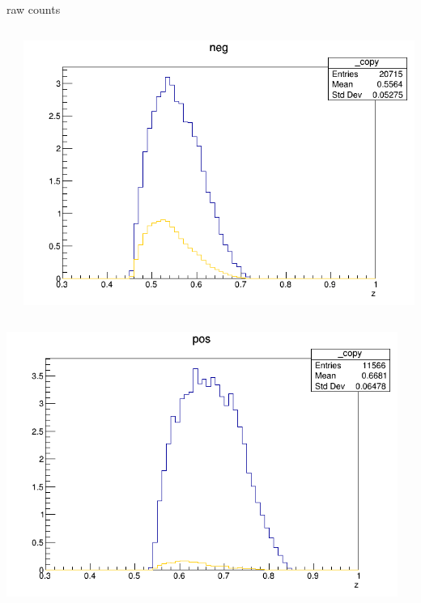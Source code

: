 \begin{frame}{raw counts}
\begin{columns}
\begin{column}[T]{0.25\textwidth}
\end{column}
\begin{column}[T]{0.25\textwidth}
\includegraphics[width = \textwidth]{results/yield/statistics/yield_x_Q2_z_0.60_5.500_0.55_neg.png}
\end{column}
\end{columns}
\begin{columns}
\begin{column}[T]{0.25\textwidth}
\includegraphics[width = \textwidth]{results/yield/statistics/yield_x_Q2_z_0.60_5.500_0.65_pos.png}
\end{column}
\begin{column}[T]{0.25\textwidth}

\end{column}
\end{columns}
\end{frame}
